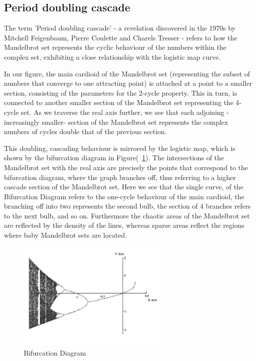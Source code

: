 \documentclass[a4paper]{article}
\begin{document}
\subsection{Period doubling cascade}
The term 'Period doubling cascade' - a revelation discovered in the 1970s by Mitchell Feigenbaum, Pierre Coulette and Charels Tresser - refers to how the Mandelbrot set represents the cyclic behaviour of the numbers within the complex set, exhibiting a close relationship with the logistic map curve.

In our figure, the main cardioid of the Mandelbrot set (representing the subset of numbers that converge to one attracting point) is attached at a point to a smaller section, consisting of the parameters for the 2-cycle property. This in turn, is connected to another smaller section of the Mandelbrot set representing the 4-cycle set. As we traverse the real axis further, we see that each adjoining -increasingly smaller- section of the Mandelbrot set represents the complex numbers of cycles double that of the previous section. 

This doubling, cascading behaviour is mirrored by the logistic map, which is shown by the bifurcation diagram in Figure(~\ref{fig:bifurcationgraph}). The intersections of the Mandelbrot set with the real axis are precisely the points that correspond to the bifurcation diagram, where the graph branches off, thus referring to a higher cascade section of the Mandelbrot set. Here we see that the single curve, of the Bifurcation Diagram refers to the one-cycle behaviour of the main cardioid, the branching off into two represents the second bulb, the section of 4 branches refers to the next bulb, and so on. Furthermore the chaotic areas of the Mandelbrot set are reflected by the density of the lines, whereas sparse areas reflect the regions where baby Mandelbrot sets are located.

\begin{figure}[h]
\centering
\includegraphics[width=0.65\textwidth]{bifurcationgraph}
\caption{\label{fig:bifurcationgraph}Bifurcation Diagram~\cite{PeriodDoublingBifurcation}}
\end{figure}
\pagebreak
\end{document}
